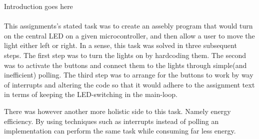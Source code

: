 Introduction goes here\\\\
This assignments's stated task was to create an assebly program that would turn on the central LED on a given microcontroller, and then allow a user to move the light either left or right.
In a sense, this task was solved in three subsequent steps. The first step was to turn the lights on by hardcoding them. The second was to activate the buttons and connect them to the lights through simple(and inefficient) polling. The third step was to arrange for the buttons to work by way of interrupts and altering the code so that it would adhere to the assignment text in terms of keeping the LED-switching in the main-loop.

There was however another more holistic side to this task. Namely energy efficiency. By using techniques such as interrupts instead of polling an implementation can perform the same task while consuming far less energy.

